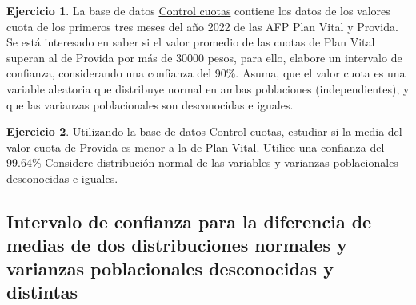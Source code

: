 \documentclass[
  11pt,
]{book}
\theoremstyle{definition}
\theoremstyle{definition}
\theoremstyle{definition}
\newtheorem{exercise}{Ejercicio}[chapter]
\theoremstyle{definition}
\theoremstyle{remark}
\begin{document}
\begin{exercise}
\protect\hypertarget{exr:ICcontrolcuotas}{}\label{exr:ICcontrolcuotas}La base de datos \hyperref[Cuotas]{Control cuotas} contiene los datos de los valores cuota de los primeros tres meses del año 2022 de las AFP Plan Vital y Provida. Se está interesado en saber si el valor promedio de las cuotas de Plan Vital superan al de Provida por más de 30000 pesos, para ello, elabore un intervalo de confianza, considerando una confianza del 90\%. Asuma, que el valor cuota es una variable aleatoria que distribuye normal en ambas poblaciones (independientes), y que las varianzas poblacionales son desconocidas e iguales.
\end{exercise}

\begin{exercise}
Utilizando la base de datos \hyperref[Cuotas]{Control cuotas}, estudiar si la media del valor cuota de Provida es menor a la de Plan Vital. Utilice una confianza del 99.64\% Considere distribución normal de las variables y varianzas poblacionales desconocidas e iguales.
\end{exercise}

\subsection{Intervalo de confianza para la diferencia de medias de dos distribuciones normales y varianzas poblacionales desconocidas y distintas}\label{intervalo-de-confianza-para-la-diferencia-de-medias-de-dos-distribuciones-normales-y-varianzas-poblacionales-desconocidas-y-distintas}

\begin{table}[H]
\centering
\caption{\label{tab:unnamed-chunk-17}Intervalos de confianza para la diferencia de medias de dos distribucones normales y varianzas poblacionales desconocidas y distintas}
\centering
{}
\end{table}
\end{document}
